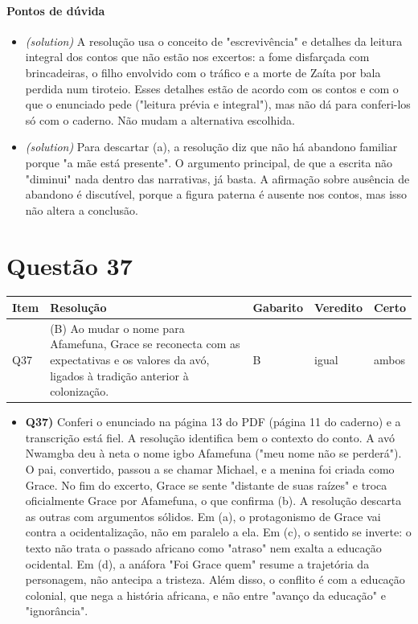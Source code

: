 \documentclass{article}%
\begin{document}
\paragraph{Pontos de dúvida}%
\begin{itemize}%
\item%
\textit{(solution)} A resolução usa o conceito de "escrevivência" e detalhes da leitura integral dos contos que não estão nos excertos: a fome disfarçada com brincadeiras, o filho envolvido com o tráfico e a morte de Zaíta por bala perdida num tiroteio. Esses detalhes estão de acordo com os contos e com o que o enunciado pede ("leitura prévia e integral"), mas não dá para conferi{-}los só com o caderno. Não mudam a alternativa escolhida.%
\item%
\textit{(solution)} Para descartar (a), a resolução diz que não há abandono familiar porque "a mãe está presente". O argumento principal, de que a escrita não "diminui" nada dentro das narrativas, já basta. A afirmação sobre ausência de abandono é discutível, porque a figura paterna é ausente nos contos, mas isso não altera a conclusão.%
\end{itemize}%
\section*{Questão 37}%
\begin{longtable}{@{}p{} p{} p{} p{} p{}@{}}\toprule Item & Resolução & Gabarito & Veredito & Certo \\ \midrule
Q37 & (B) Ao mudar o nome para Afamefuna, Grace se reconecta com as expectativas e os valores da avó, ligados à tradição anterior à colonização. & B & igual & ambos \\
\bottomrule\end{longtable}%
\begin{itemize}%
\item%
\textbf{Q37)} Conferi o enunciado na página 13 do PDF (página 11 do caderno) e a transcrição está fiel. A resolução identifica bem o contexto do conto. A avó Nwamgba deu à neta o nome igbo Afamefuna ("meu nome não se perderá"). O pai, convertido, passou a se chamar Michael, e a menina foi criada como Grace. No fim do excerto, Grace se sente "distante de suas raízes" e troca oficialmente Grace por Afamefuna, o que confirma (b). A resolução descarta as outras com argumentos sólidos. Em (a), o protagonismo de Grace vai contra a ocidentalização, não em paralelo a ela. Em (c), o sentido se inverte: o texto não trata o passado africano como "atraso" nem exalta a educação ocidental. Em (d), a anáfora "Foi Grace quem" resume a trajetória da personagem, não antecipa a tristeza. Além disso, o conflito é com a educação colonial, que nega a história africana, e não entre "avanço da educação" e "ignorância".%
\end{itemize}%
\end{document}
